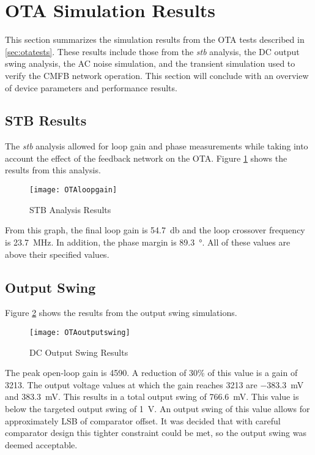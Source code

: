 \section{OTA Simulation Results}
This section summarizes the simulation results from the OTA tests described in \ref{sec:otatests}. These results include those from the \textit{stb} analysis, the DC output swing analysis, the AC noise simulation, and the transient simulation used to verify the CMFB network operation. This section will conclude with an overview of device parameters and performance results.
\subsection{STB Results}
The \textit{stb} analysis allowed for loop gain and phase measurements while taking into account the effect of the feedback network on the OTA. Figure \ref{fig:otastbresult} shows the results from this analysis. 
\begin{figure}[htbp]
\centering
\texttt{[image: OTAloopgain]}
\caption{STB Analysis Results} 
\label{fig:otastbresult}
\end{figure}
From this graph, the final loop gain is \SI{54.7}{\decibel} and the loop crossover frequency is \SI{23.7}{\mega\hertz}. In addition, the phase margin is \SI{89.3}{\degree}. All of these values are above their specified values.
\subsection{Output Swing}
Figure \ref{fig:otaoutputswing} shows the results from the output swing simulations. 
\begin{figure}[htbp]
\centering
\texttt{[image: OTAoutputswing]}
\caption{DC Output Swing Results} 
\label{fig:otaoutputswing}
\end{figure}
The peak open-loop gain is 4590. A reduction of 30\% of this value is a gain of 3213. The output voltage values at which the gain reaches 3213 are \SI{-383.3}{\milli\volt} and \SI{383.3}{\milli\volt}. This results in a total output swing of \SI{766.6}{\milli\volt}. This value is below the targeted output swing of \SI{1}{\volt}. An output swing of this value allows for approximately  LSB of comparator offset. It was decided that with careful comparator design this tighter constraint could be met, so the output swing was deemed acceptable.
